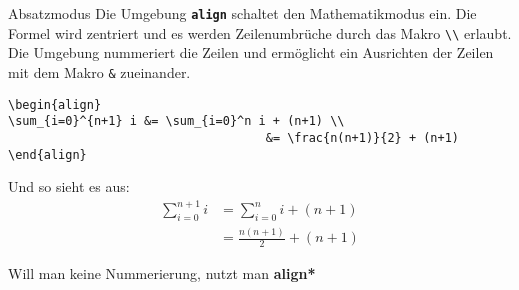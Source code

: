 \begin{frame}[fragile]{Absatzmodus}
Die Umgebung \textbf{\texttt{align}} schaltet den Mathematikmodus ein. Die Formel wird zentriert und es werden Zeilenumbrüche durch das Makro \texttt{\textbackslash\textbackslash} erlaubt. Die Umgebung nummeriert die Zeilen und ermöglicht ein Ausrichten der Zeilen mit dem Makro \texttt{\&} zueinander. 
\begin{lstlisting}[style=tex]
\begin{align}
\sum_{i=0}^{n+1} i &= \sum_{i=0}^n i + (n+1) \\
                                    &= \frac{n(n+1)}{2} + (n+1)
\end{align}
\end{lstlisting}

Und so sieht es aus:
\begin{align}
\sum_{i=0}^{n+1} i &= \sum_{i=0}^n i + (n+1) \\
                       &= \frac{n(n+1)}{2} + (n+1)
\end{align}%

Will man keine Nummerierung, nutzt man \textbf{align*}
\end{frame}

